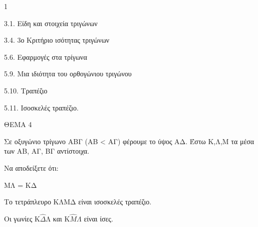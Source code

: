 \begin{ylh}{1}
    \item 3.1. Είδη και στοιχεία τριγώνων
    \item 3.4. 3ο Κριτήριο ισότητας τριγώνων
    \item 5.6. Εφαρμογές στα τρίγωνα
    \item 5.9. Μια ιδιότητα του ορθογώνιου τριγώνου
    \item 5.10. Τραπέζιο
    \item 5.11. Ισοσκελές τραπέζιο.
\end{ylh}

ΘΕΜΑ 4

Σε οξυγώνιο τρίγωνο ΑΒΓ (ΑΒ \textless{} ΑΓ) φέρουμε το ύψος ΑΔ. Έστω Κ,Λ,Μ τα μέσα των ΑΒ, ΑΓ, ΒΓ αντίστοιχα.

Να αποδείξετε ότι:

\begin{alist}
\item ΚΛ // ΒΓ 

\item

.}
\end{alist}
\begin{alist}
\item
  ΜΛ = ΚΔ 
\item
  Το τετράπλευρο ΚΛΜΔ είναι ισοσκελές τραπέζιο. 

\item Οι γωνίες Κ$\widehat{\Delta}\text{Λ}$ και $\text{Κ}\widehat{Μ}\Lambda$ είναι ίσες. 
\end{alist}
